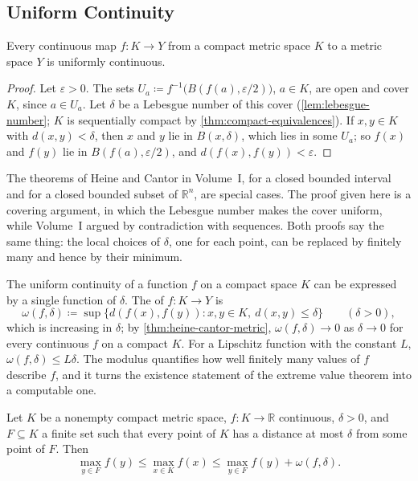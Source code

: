 \subsection{Uniform Continuity}

\begin{theorem}
\label{thm:heine-cantor-metric}
Every continuous map $f\colon K\to Y$ from a compact metric space $K$ to a metric space $Y$ is uniformly continuous.
\end{theorem}

\begin{proof}
Let $\varepsilon>0$. The sets $U_a\coloneqq f^{-1}\bigl(B(f(a),\varepsilon/2)\bigr)$, $a\in K$, are open and cover $K$, since $a\in U_a$. Let $\delta$ be a Lebesgue number of this cover (\cref{lem:lebesgue-number}; $K$ is sequentially compact by \cref{thm:compact-equivalences}). If $x,y\in K$ with $d(x,y)<\delta$, then $x$ and $y$ lie in $B(x,\delta)$, which lies in some $U_a$; so $f(x)$ and $f(y)$ lie in $B(f(a),\varepsilon/2)$, and $d(f(x),f(y))<\varepsilon$.
\end{proof}

The theorems of Heine and Cantor in Volume~I,  for a closed bounded interval and  for a closed bounded subset of $\mathbb R^n$, are special cases. The proof given here is a covering argument, in which the Lebesgue number makes the cover uniform, while Volume~I argued by contradiction with sequences. Both proofs say the same thing: the local choices of $\delta$, one for each point, can be replaced by finitely many and hence by their minimum.

The uniform continuity of a function $f$ on a compact space $K$ can be expressed by a single function of $\delta$. The  of $f\colon K\to Y$ is
\[
\omega(f,\delta)\coloneqq\sup\{d(f(x),f(y)): x,y\in K,\ d(x,y)\le\delta\}\qquad(\delta>0),
\]
which is increasing in $\delta$; by \cref{thm:heine-cantor-metric}, $\omega(f,\delta)\to0$ as $\delta\to0$ for every continuous $f$ on a compact $K$. For a Lipschitz function with the constant $L$, $\omega(f,\delta)\le L\delta$. The modulus quantifies how well finitely many values of $f$ describe $f$, and it turns the existence statement of the extreme value theorem into a computable one.

\begin{proposition}
\label{prop:net-maximum}
Let $K$ be a nonempty compact metric space, $f\colon K\to\mathbb R$ continuous, $\delta>0$, and $F\subseteq K$ a finite set such that every point of $K$ has a distance at most $\delta$ from some point of $F$. Then
\[
\max_{y\in F}f(y)\le\max_{x\in K}f(x)\le\max_{y\in F}f(y)+\omega(f,\delta) .
\]
\end{proposition}

